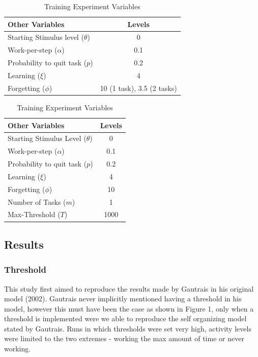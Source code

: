 \documentclass[a4paper]{article}
\begin{document}
\begin{table}[H]
\caption{Other Variables}\label{table:3}
\begin{subtable}[H]{3in}
\centering
  \begin{tabular}{ | l | c | }
    \hline
     \textbf{Other Variables} &  \textbf{Levels}  \\ \hline
    Starting Stimulus level ($\theta$) & 0\\ \hline
    Work-per-step ($\alpha$) & 0.1 \\
    \hline
    Probability to quit task ($p$) & 0.2\\ \hline
    Learning ($\xi$) &	4 \\ \hline
    Forgetting ($\phi$) & 10 (1 task), 3.5 (2 tasks) \\ \hline
  \end{tabular}
  \caption{Confirmation and Threshold Experiment Variables}\label{table:3a}
 \end {subtable}
\quad
\begin{subtable}[H]{3in}
\centering
\begin{tabular}{ | l | c | }
    \hline
     \textbf{Other Variables} &  \textbf{Levels}  \\ \hline
    Starting Stimulus Level ($\theta$) & 0\\  \hline
     Work-per-step ($\alpha$) & 0.1 \\
    \hline
    Probability to quit task ($p$) & 0.2\\ \hline
    Learning ($\xi$) &	4 \\ \hline
    Forgetting ($\phi$) & 10  \\ \hline
    Number of Tasks ($m$) & 1 \\ \hline
    Max-Threshold ($T$) & 1000 \\ \hline
  \end{tabular}
  \caption{Training Experiment Variables}\label{table:3b}
\end {subtable}
\end{table}
\FloatBarrier

\subsection {Results}


\subsubsection {Threshold}


This study first aimed to reproduce the results made by Gautrais in his original model (2002). Gautrais never implicitly mentioned having a threshold in his model, however this must have been the case as shown in Figure 1, only when a threshold is implemented were we able to reproduce the self organizing model stated by Gautrais. Runs in which thresholds were set very high, activity levels were limited to the two extremes - working the max amount of time or never working.
\end{document}
